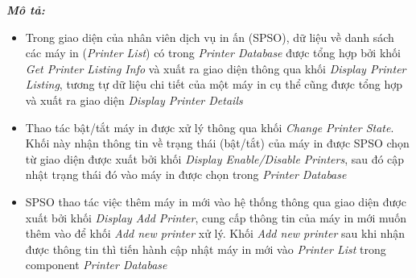\textbf{\textit{Mô tả:}}
\begin{itemize}
    \item Trong giao diện của nhân viên dịch vụ in ấn (SPSO), dữ liệu về danh sách các máy in (\textit{Printer List}) có trong \textit{Printer Database} được tổng hợp bởi khối \textit{Get Printer Listing Info} và xuất ra giao diện thông qua khối \textit{Display Printer Listing}, tương tự dữ liệu chi tiết của một máy in cụ thể cũng được tổng hợp và xuất ra giao diện \textit{Display Printer Details}
    \item Thao tác bật/tắt máy in được xử lý thông qua khối \textit{Change Printer State}. Khối này nhận thông tin về trạng thái (bật/tắt) của máy in được SPSO chọn từ giao diện được xuất bởi khối \textit{Display Enable/Disable Printers}, sau đó cập nhật trạng thái đó vào máy in được chọn trong \textit{Printer Database}

    \item SPSO thao tác việc thêm máy in mới vào hệ thống thông qua giao diện được xuất bởi khối \textit{Display Add Printer}, cung cấp thông tin của máy in mới muốn thêm vào để khối \textit{Add new printer} xử lý. Khối \textit{Add new printer} sau khi nhận được thông tin thì tiến hành cập nhật máy in mới vào \textit{Printer List} trong component \textit{Printer Database}
\end{itemize}

